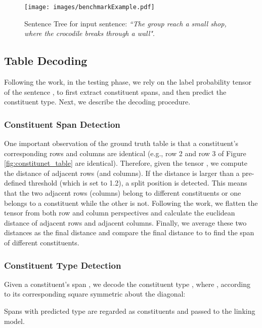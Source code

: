 \documentclass[11pt,a4paper]{article}
\begin{document}
\begin{figure}[t]
\centering
\texttt{[image: images/benchmarkExample.pdf]}
\caption{Sentence Tree for input sentence: \emph{``The group reach a small shop, where the crocodile breaks through a wall"}.}
\label{fig:BenchmarkExample}
\vspace{-1em}
\end{figure}

\subsection{Table Decoding}
\label{sec:2stepDecoding}
Following the \cite{wang2021unire} work, in the testing phase, we rely on the label probability tensor  of the sentence , to first extract constituent spans, and then predict the constituent type. Next, we describe the decoding procedure.

\subsubsection{Constituent Span Detection}
One important observation of the ground truth table is that a constituent's corresponding rows and columns are identical (e.g., row 2 and row 3 of Figure \ref{fig:constitunet_table} are identical). Therefore, given the tensor , we compute the distance of adjacent rows (and columns). If the distance is larger than a pre-defined threshold  (which is set to 1.2), a split position is detected. This means that the two adjacent rows (columns) belong to different constituents or one belongs to a constituent while the other is not. Following the \cite{wang2021unire} work, we flatten the  tensor from both row and column perspectives and calculate the euclidean distance of adjacent rows and adjacent columns. Finally, we average these two distances as the final distance and compare the final  distance to  to find the span of different constituents.
\subsubsection{Constituent Type Detection}
Given a constituent's span , we decode the constituent type , where , according to its corresponding square symmetric about the diagonal:

Spans with predicted type  are regarded as constituents and passed to the linking model.
\end{document}
